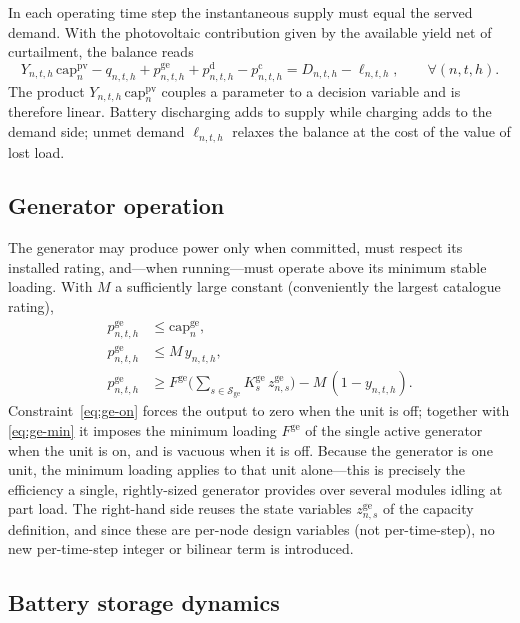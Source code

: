 \documentclass[11pt,a4paper]{article}
\theoremstyle{plain}
\theoremstyle{definition}
\begin{document}
In each operating time step the instantaneous supply must equal the served demand. With
the photovoltaic contribution given by the available yield net of curtailment, the
balance reads
\begin{equation}
  Y_{n,t,h}\,\mathrm{cap}^{\mathrm{pv}}_n - q_{n,t,h}
  + p^{\mathrm{ge}}_{n,t,h}
  + p^{\mathrm{d}}_{n,t,h} - p^{\mathrm{c}}_{n,t,h}
  = D_{n,t,h} - \ell_{n,t,h},
  \qquad \forall (n,t,h).
  \label{eq:balance}
\end{equation}
The product $Y_{n,t,h}\,\mathrm{cap}^{\mathrm{pv}}_n$ couples a parameter to a decision
variable and is therefore linear. Battery discharging adds to supply while charging adds
to the demand side; unmet demand $\ell_{n,t,h}$ relaxes the balance at the cost of the
value of lost load.

\subsection{Generator operation}
\label{sec:generator}

The generator may produce power only when committed, must respect its installed rating,
and---when running---must operate above its minimum stable loading. With $M$ a
sufficiently large constant (conveniently the largest catalogue rating),
\begin{align}
  p^{\mathrm{ge}}_{n,t,h} &\leq \mathrm{cap}^{\mathrm{ge}}_n, \label{eq:ge-cap}\\
  p^{\mathrm{ge}}_{n,t,h} &\leq M\, y_{n,t,h}, \label{eq:ge-on}\\
  p^{\mathrm{ge}}_{n,t,h} &\geq F^{\mathrm{ge}}
      \Big(\sum_{s\in\mathcal{S}_{\mathrm{ge}}}K^{\mathrm{ge}}_s\,
      z^{\mathrm{ge}}_{n,s}\Big) - M\,(1-y_{n,t,h}). \label{eq:ge-min}
\end{align}
Constraint~\eqref{eq:ge-on} forces the output to zero when the unit is off; together with
\eqref{eq:ge-min} it imposes the minimum loading $F^{\mathrm{ge}}$ of the single active
generator when the unit is on, and is vacuous when it is off. Because the generator is one
unit, the minimum loading applies to that unit alone---this is precisely the efficiency a
single, rightly-sized generator provides over several modules idling at part load. The
right-hand side reuses the state variables $z^{\mathrm{ge}}_{n,s}$ of the capacity
definition, and since these are per-node design variables (not per-time-step), no new
per-time-step integer or bilinear term is introduced.

\subsection{Battery storage dynamics}
\label{sec:battery}
\end{document}
